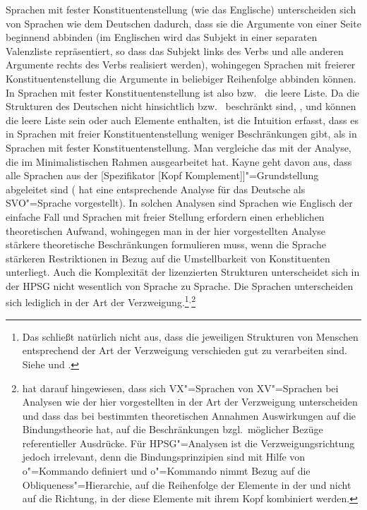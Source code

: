 Sprachen mit fester
Konstituentenstellung (wie das
Englische) unterscheiden sich von Sprachen wie dem Deutschen dadurch, dass sie die
Argumente von einer Seite beginnend abbinden (im Englischen wird das Subjekt in einer separaten
Valenzliste repräsentiert, so dass das Subjekt links des Verbs und alle anderen Argumente rechts des
Verbs realisiert werden), wohingegen Sprachen mit freierer Konstituentenstellung die Argumente
in beliebiger Reihenfolge abbinden können. In Sprachen mit fester Konstituentenstellung ist also
 bzw.\  die leere Liste. Da die Strukturen des Deutschen nicht hinsichtlich 
bzw.\  beschränkt sind, \dash,  und  können die leere Liste sein oder auch
Elemente enthalten, ist die Intuition erfasst, dass es in Sprachen mit freier Konstituentenstellung
weniger Beschränkungen gibt, als in Sprachen mit fester Konstituentenstellung. Man vergleiche das
mit der Analyse, die \citet{Kayne94a-u} im Minimalistischen Rahmen ausgearbeitet hat. Kayne geht
davon aus, dass alle Sprachen aus der [Spezifikator [Kopf Komplement]]"=Grundstellung abgeleitet sind
(\citet{Laenzlinger2004a} hat eine entsprechende Analyse für das Deutsche als
SVO"=Sprache vorgestellt). In solchen Analysen sind Sprachen wie
Englisch der einfache Fall und Sprachen mit freier Stellung erfordern einen erheblichen
theoretischen Aufwand, wohingegen man in der hier vorgestellten Analyse stärkere theoretische
Beschränkungen formulieren muss, wenn die Sprache stärkeren Restriktionen in Bezug auf die
Umstellbarkeit von Konstituenten unterliegt. Auch die Komplexität der lizenzierten Strukturen
unterscheidet sich in der HPSG nicht wesentlich von Sprache zu Sprache. Die Sprachen unterscheiden
sich lediglich in der Art der Verzweigung.\footnote{ 
Das schließt natürlich nicht aus, dass die
  jeweiligen Strukturen von Menschen entsprechend der Art der Verzweigung verschieden gut zu
  verarbeiten sind. Siehe  und \citet[Abschnitt~11.3]{MuellerGTBuch1}.
}$^,$\footnote{%
\citet[]{Haider97c} hat darauf hingewiesen, dass sich VX"=Sprachen von XV"=Sprachen bei
Analysen wie der hier vorgestellten in der Art der Verzweigung unterscheiden und dass das bei bestimmten
theoretischen Annahmen Auswirkungen auf die Bindungstheorie hat, \dash auf die
Beschränkungen bzgl.\ möglicher Bezüge referentieller Ausdrücke. Für HPSG"=Analysen
ist die Verzweigungsrichtung jedoch irrelevant, denn die Bindungsprinzipien sind mit Hilfe von
o"=Kommando definiert \citep[Kapitel~6]{ps2} und o"=Kommando nimmt Bezug auf die
Obliqueness"=Hierarchie, \dash auf die Reihenfolge der Elemente in der \compsl und nicht auf die
Richtung, in der diese Elemente mit ihrem Kopf kombiniert werden. 
}


